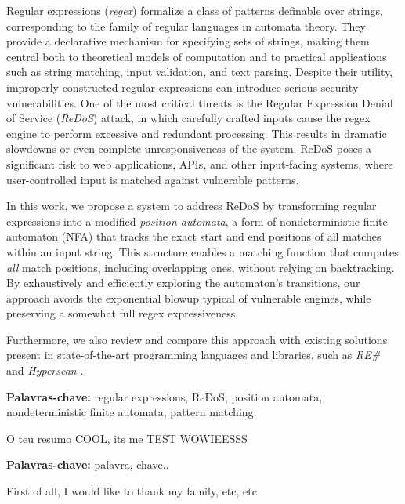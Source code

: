 








Regular expressions (\emph{regex}) formalize a class of patterns definable over strings, corresponding to the family of regular languages in automata theory. They provide a declarative mechanism for specifying sets of strings, making them central both to theoretical models of computation and to practical applications such as string matching, input validation, and text parsing. Despite their utility, improperly constructed regular expressions can introduce serious security vulnerabilities. One of the most critical threats is the Regular Expression Denial of Service (\emph{ReDoS}) attack, in which carefully crafted inputs cause the regex engine to perform excessive and redundant processing. This results in dramatic slowdowns or even complete unresponsiveness of the system. ReDoS poses a significant risk to web applications, APIs, and other input-facing systems, where user-controlled input is matched against vulnerable patterns.

In this work, we propose a system to address ReDoS by transforming regular expressions into a modified \emph{position automata}, a form of nondeterministic finite automaton (NFA) that tracks the exact start and end positions of all matches within an input string. This structure enables a matching function that computes \emph{all} match positions, including overlapping ones, without relying on backtracking. By exhaustively and efficiently exploring the automaton's transitions, our approach avoids the exponential blowup typical of vulnerable engines, while preserving a somewhat full regex expressiveness.

Furthermore, we also review and compare this approach with existing solutions present in state-of-the-art programming languages and libraries, such as \emph{RE\#} \cite{resharp_tool_paper} and \emph{Hyperscan} \cite{hyperscan_paper}.

\textbf{Palavras-chave:} regular expressions, ReDoS, position automata, nondeterministic finite automata, pattern matching.

O teu resumo COOL, its me TEST WOWIEESSS

\textbf{Palavras-chave:} palavra, chave..


First of all, I would like to thank my family, etc, etc
